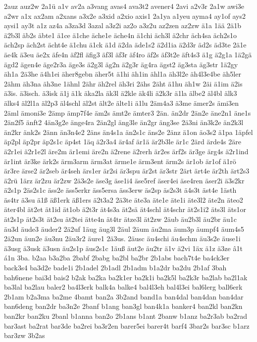 {2auz
auz2w
2a1ü
a1v
av2a
a3vang
avas4
ava3t2
avener4
2avi
a2v3r
2a1w
awi3e
a2wr
a1x
ax2am
a2xans
a3x2e
a3xid
a2xio
axis1
2a1ya
a1yeu
ayma4
ay1of
ays2
aysi1
ay3t
a1z
az4a
a3za3d
3azal
a3z2i
az2o
a3z2u
az2zen
az2zw
ä1a
1ää
2ä1b
ä2b3l
äb2s
äbte1
ä1ce
ä1che
äche1e
äche4n
ä1chi
äch3l
ä2chr
äch4sa
äch2s1o
äch2sp
äch2st
ächt4e
ä1chu
ä1ck
ä1d
ä2da
äde1s2
ä2d1ia
ä2d3r
äd2s
äd3te
2ä1e
äe4k
ä3eu
äe2x
äfe4n
äf2fl
äfig3
äf3l
äf3r
äf4ro
äf2s
äf3t2e
äft4s3
ä1g
ä2g1a
1ä2gä
ägd2
ägen4e
äge2r3a
äge3s
ä2g3l
äg2n
ä2g3r
äg4ra
ägst2
äg3sta
äg3str
1ä2gy
äh1a
2ä3he
ä4h1ei
äher8gebn
äher5t
ä1hi
äh1in
ähl1a
äh3l2e
äh4l3e4be
äh5ler
2ähm
äh3na
äh3ne
1ähnl
2ähr
äh2rel
äh3ri
2ähs
2äht
ä1hu
äh1w
2äi
ä1im
ä2is
ä3is.
ä3isch.
ä3isk
ä1j
ä1k
äka2la
äk3l
ä2kle
äk4li
ä2k3r
ä1la
älbe2
äl4bl
älk3
älks4
äl2l1a
äl2p3
äl4schl
äl2st
ält2e
älte1i
ä1lu
2äm4a3
ä3me
ämer2s
ämi3en
2äml
ämoni3e
2ämp
ämp7f4e
äm2s
ämt2e
ämter3
2än.
än2dr
2än2e
äne2n1
äne1s
2än2f5
änft2
4än3g2e
änge4ra
2än2gl
äng3le
än2gr
äng3se
2ä3ni
än3k2e
än2k3l
än2kr
änk2s
2änn
än3n4e2
2äns
än4s1a
än2s1c
äns2e
2änz
ä1on
äo3s2
ä1pa
1äpfel
äp2pl
äp2pr
äp2s1c
äp4st
1äq
ä2r3a4
är4af
är1ä
är2b3le
är1c
2ärd
ärde4s
2äre
ä2r1ei
ä2r1e2l
äre2m
är1emi
äre2n
ä2rene
ä2rerh
är2es
ärf2s
är3ge
ärg4s
ä2r1ind
är1int
är3ke
ärk2s
ärm3arm
ärm3at
ärme1e
ärm3ent
ärm2s
är1ob
är1of
ä1rö
är3re
ärse2
är2seb
är4seh
ärs1er
är2si
är3spu
är2st
är3str
2ärt
ärt4e
är2th
ärt2s3
ä2rü
1ärz
är2zu
är2zw
2ä3s2e
äse3g
äse1i4
äse5ref
äser4ei
äse4ren
äser2i
ä3s2kr
ä2s1p
2äs2s1c
äss2e
äss5erkr
äss5ersa
äss3erw
äs2sp
äs2s3t
ä4s3t
äst4e
1ästh
äs4tr
ä3su
ä1ß
äß1erk
äß1ers
ä2t3a2
2ä3te
äte3a
äte1e
äte1i
äte3l2
äte2n
äteo2
äter4bl
ät2et
ät1id
ät1ob
ä2t3r
ät4s3a
ät2sä
ät4schl
ät4schr
ät2s1i2
äts3l
äts1or
ät2s1p
ät2s3t
ät2su
ät2tei
ätte4n
ät4tr
ätze3l
ät2zw
2äub
äu2b3l
äu2br
äu1c
äu3d
äude3
äuder2
2ä2uf
1äug
äug3l
2äul
2äum
äu2ma
äum3p
äumpf4
äum4s5
2ä2un
äun2e
äu3nu
2äu3r2
äure1
2ä3us.
2äusc
äu4schi
äu4schm
äu3s2e
äuse1i
ä3usg
ä3usk
ä3usn
äu2s1p
äus2s1c
1äuß
äut2e
äu2tr
ä1v
ä2vi
1äx
ä1z
ä3ze
â1t
á1n
3ba.
b2aa
b3a2ba
2babf
2babg
ba2bl
ba2br
2b1abs
bach7t4e
ba4ck3er
back3s4
ba3d2e
bade1i
2b1adel
2b1adl
2b1adm
b1a2dr
ba2du
2b1af
3bah
bah6nene
bai3d
bais2
b2ak
ba2ka
ba2k1er
ba2k1i
ba2k5l
ba2k3r
ba2lab
ba2l1ak
ba3lal
ba2lau
baler2
ba4l3erk
balk4a
balke4
bal4l3eh
bal4l3ei
bal6lerg
ball6erk
2b1am
b2a3ma
ba2me
4bamt
ban2a
3b2and
band1a
ban4dal
ban4dan
ban4dar
ban6deng
ban2dr
ba3n2e
2banf
b1ang
ban3gl
ban4k1a
banker4
ban2kl
ban2kn
ban2kr
ban2ku
2banl
b1anna
ban2o
2b1ans
b1ant
2banw
b1anz
ba2r3ab
ba2rad
bar3ast
ba2rat
bar3de
ba2rei
ba3r2en
barer5ei
barer4t
barf4
3bar2s
bar3sc
b1arz
bar3zw
3b2as
}
